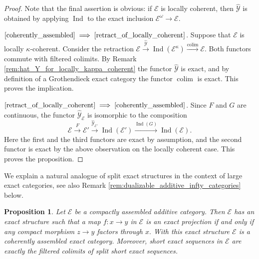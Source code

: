 \documentclass[11pt,leqno]{amsart}
\newcommand{\Implies}[2]{$\text{\ref{#1}}\implies\text{\ref{#2}}$}
\newtheorem{prop}[theo]{Proposition}
\numberwithin{equation}{section}
\DeclareMathOperator*{\colim}{colim}
\newcommand{\xto}{\xrightarrow}
\newcommand{\cE}{{\mathcal E}}
\newcommand{\cY}{{\mathcal Y}}
\newcommand{\Ind}{\operatorname{Ind}}
\begin{document}
\begin{proof}
Note that the final assertion is obvious: if $\cE$ is locally coherent, then $\hat{\cY}$ is obtained by applying $\Ind$ to the exact inclusion $\cE^{\omega}\to\cE.$

\Implies{coherently_assembled}{retract_of_locally_coherent}. Suppose that $\cE$ is locally $\kappa$-coherent. Consider the retraction $\cE\xto{\hat{\cY}}\Ind(\cE^{\kappa})\xto{\colim}\cE.$ Both functors commute with filtered colimits. By Remark \ref{rem:hat_Y_for_locally_kappa_coherent} the functor $\hat{\cY}$ is exact, and by definition of a Grothendieck exact category the functor $\colim$ is exact. This proves the implication.

\Implies{retract_of_locally_coherent}{coherently_assembled}. Since $F$ and $G$ are continuous, the functor $\hat{\cY}_{\cE}$ is isomorphic to the composition
\begin{equation*}
\cE\xto{F}\cE'\xto{\hat{\cY}_{\cE'}} \Ind(\cE')\xto{\Ind(G)}\Ind(\cE).
\end{equation*}
Here the first and the third functors are exact by assumption, and the second functor is exact by the above observation on the locally coherent case. This proves the proposition.
\end{proof}

We explain a natural analogue of split exact structures in the context of large exact categories, see also Remark \ref{rem:dualizable_additive_infty_categories} below.

\begin{prop}\label{prop:minimal_exact_structure}
Let $\cE$ be a compactly assembled additive category. Then $\cE$ has an exact structure such that a map $f:x\to y$ in $\cE$ is an exact projection if and only if any compact morphism $z\to y$ factors through $x.$ With this exact structure $\cE$ is a coherently assembled exact category. Moreover, short exact sequences in $\cE$ are exactly the filtered colimits of split short exact sequences. 
\end{prop}
\end{document}

